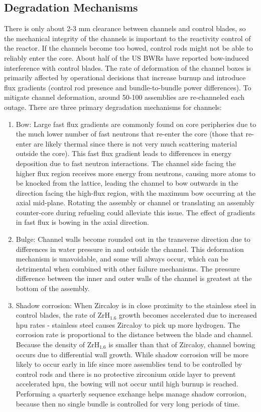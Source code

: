 \documentclass[10pt]{article}
\begin{document}
\subsection{Degradation Mechanisms}

There is only about 2-3 mm clearance between channels and control blades, so the mechanical integrity of the channels is important to the reactivity control of the reactor. If the channels become too bowed, control rods might not be able to reliably enter the core. About half of the US BWRs have reported bow-induced interference with control blades. The rate of deformation of the channel boxes is primarily affected by operational decisions that increase burnup and introduce flux gradients (control rod presence and bundle-to-bundle power differences). To mitigate channel deformation, around 50-100 assemblies are re-channeled each outage. There are three primary degradation mechanisms for channels:

\begin{enumerate}
\item Bow: Large fast flux gradients are commonly found on core peripheries due to the much lower number of fast neutrons that re-enter the core (those that re-enter are likely thermal since there is not very much scattering material outside the core). This fast flux gradient leads to differences in energy deposition due to fast neutron interactions. The channel side facing the higher flux region receives more energy from neutrons, causing more atoms to be knocked from the lattice, leading the channel to bow outwards in the direction facing the high-flux region, with the maximum bow occurring at the axial mid-plane. Rotating the assembly or channel or translating an assembly counter-core during refueling could alleviate this issue. The effect of gradients in fast flux is bowing in the axial direction.
\item Bulge: Channel walls become rounded out in the transverse direction due to differences in water pressure in and outside the channel. This deformation mechanism is unavoidable, and some will always occur, which can be detrimental when combined with other failure mechanisms. The pressure difference between the inner and outer walls of the channel is greatest at the bottom of the assembly.
\item Shadow corrosion: When Zircaloy is in close proximity to the stainless steel in control blades, the rate of \(\textrm{ZrH}_{1.6}\) growth becomes accelerated due to increased \gls{hpu} rates - stainless steel causes Zircaloy to pick up more hydrogen. The corrosion rate is proportional to the distance between the blade and channel. Because the density of \(\textrm{ZrH}_{1.6}\) is smaller than that of Zircaloy, channel bowing occurs due to differential wall growth. While shadow corrosion will be more likely to occur early in life since more assemblies tend to be controlled by control rods and there is no protective zirconium oxide layer to prevent accelerated \gls{hpu}, the bowing will not occur until high burnup is reached. Performing a quarterly sequence exchange helps manage shadow corrosion, because then no single bundle is controlled for very long periods of time.
\end{enumerate}
\end{document}
